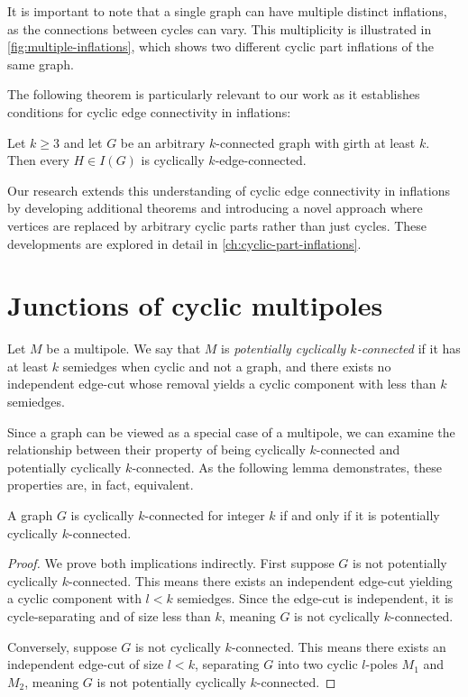 \documentclass[12pt, twoside]{book}
\begin{document}
It is important to note that a single graph can have multiple distinct inflations, as the connections between cycles can vary. This multiplicity is illustrated in \cref{fig:multiple-inflations}, which shows two different cyclic part inflations of the same graph.

The following theorem is particularly relevant to our work as it establishes conditions for cyclic edge connectivity in inflations:

\begin{theorem}\label{th:inflations-cyclic-connectivity}
	Let $k \geq 3$ and let $G$ be an arbitrary $k$-connected graph with girth at least $k$. Then every $H \in I(G)$ is cyclically $k$-edge-connected.
\end{theorem}

Our research extends this understanding of cyclic edge connectivity in inflations by developing additional theorems and introducing a novel approach where vertices are replaced by arbitrary cyclic parts rather than just cycles. These developments are explored in detail in \cref{ch:cyclic-part-inflations}.

\chapter{Junctions of cyclic multipoles}

\begin{definition}
	Let $M$ be a multipole. We say that $M$ is \textit{potentially cyclically $k$-connected} if it has at least $k$ semiedges when cyclic and not a graph, and there exists no independent edge-cut whose removal yields a cyclic component with less than $k$ semiedges.
\end{definition}

Since a graph can be viewed as a special case of a multipole, we can examine the relationship between their property of being cyclically $k$-connected and potentially cyclically $k$-connected. As the following lemma demonstrates, these properties are, in fact, equivalent.

\begin{lemma}\label{lem:graphs-potential-and-normal-cyclic-connected-eq}
	A graph $G$ is cyclically $k$-connected for integer $k$ if and only if it is potentially cyclically \mbox{$k$-connected}.
\end{lemma}

\begin{proof}
	We prove both implications indirectly. First suppose $G$ is not potentially cyclically $k$-connected. This means there exists an independent edge-cut yielding a cyclic component with $l<k$ semiedges. Since the edge-cut is independent, it is \mbox{cycle-separating} and of size less than $k$, meaning $G$ is not cyclically $k$-connected.
	
	Conversely, suppose $G$ is not cyclically \mbox{$k$-connected}. This means there exists an independent edge-cut of size $l<k$, separating $G$ into two cyclic $l$-poles $M_1$ and $M_2$, meaning $G$ is not potentially cyclically $k$-connected.
\end{proof}
\end{document}
